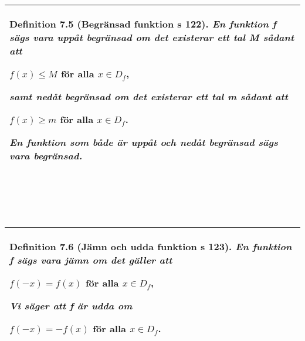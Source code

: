 \documentclass[a4paper]{article}
\begin{document}
\\\\\\
\begin{tabular}{|L{11.5cm}|} \hline
\textbf{Definition 7.5} (Begränsad funktion s 122). 
\textit{En funktion f sägs vara \textbf{uppåt begränsad} om det existerar ett tal M sådant att}
\begin{center}
$f(x) \leq M$ \hspace{1cm} för alla $x \in D_f$,
\end{center}
\textit{samt \textbf{nedåt begränsad} om det existerar ett tal m sådant att}
\begin{center}
$f(x) \geq m$ \hspace{1cm} för alla $x \in D_f$.
\end{center}
\textit{En funktion som både är uppåt och nedåt begränsad sägs vara \textbf{begränsad}.}
\\\hline
\end{tabular}
\\\\\\
\begin{tabular}{|L{11.5cm}|} \hline
\textbf{Definition 7.6} (Jämn och udda funktion s 123). 
\textit{En funktion f sägs vara \textbf{jämn} om det gäller att}
\begin{center}
$f(-x) = f(x)$ \hspace{1cm} för alla $x \in D_f$,
\end{center}
\textit{Vi säger att f är \textbf{udda} om}
\begin{center}
$f(-x) = -f(x)$ \hspace{1cm} för alla $x \in D_f$.
\end{center}
\\\hline
\end{tabular}
\end{document}
